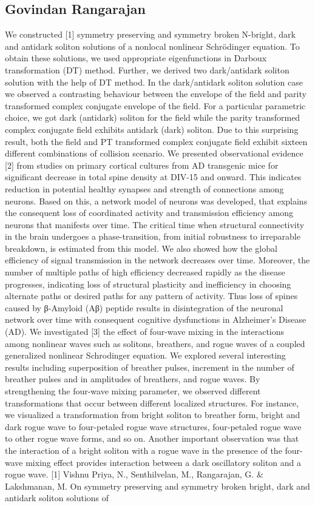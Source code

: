 \subsection{Govindan Rangarajan}

We constructed [1] symmetry preserving and symmetry broken N-bright, dark and antidark soliton solutions of a nonlocal nonlinear Schrödinger equation. To obtain these solutions, we used appropriate eigenfunctions in Darboux transformation (DT) method. Further, we derived two dark/antidark soliton solution with the help of DT method. In the dark/antidark soliton solution case we observed a contrasting behaviour between the envelope of the ﬁeld and parity transformed complex conjugate envelope of the ﬁeld. For a particular parametric choice, we got dark (antidark) soliton for the ﬁeld while the parity transformed complex conjugate ﬁeld exhibits antidark (dark) soliton. Due to this surprising result, both the ﬁeld and PT transformed complex conjugate ﬁeld exhibit sixteen different combinations of collision scenario.   We presented observational evidence [2] from studies on primary cortical cultures from AD transgenic mice for significant decrease in total spine density at DIV-15 and onward. This indicates reduction in potential healthy synapses and strength of connections among neurons. Based on this, a network model of neurons was developed, that explains the consequent loss of coordinated activity and transmission efficiency among neurons that manifests over time. The critical time when structural connectivity in the brain undergoes a phase-transition, from initial robustness to irreparable breakdown, is estimated from this model. We also showed how the global efficiency of signal transmission in the network decreases over time. Moreover, the number of multiple paths of high efficiency decreased rapidly as the disease progresses, indicating loss of structural plasticity and inefficiency in choosing alternate paths or desired paths for any pattern of activity. Thus loss of spines caused by β-Amyloid (Aβ) peptide results in disintegration of the neuronal network over time with consequent cognitive dysfunctions in Alzheimer’s Disease (AD).  We investigated [3] the effect of four-wave mixing in the interactions among nonlinear waves such as solitons, breathers, and rogue waves of a coupled generalized nonlinear Schrodinger equation. We explored several interesting results including superposition of breather pulses, increment in the number of breather pulses and in amplitudes of breathers, and rogue waves. By strengthening the four-wave mixing parameter, we observed different transformations that occur between different localized structures. For instance, we visualized a transformation from bright soliton to breather form, bright and dark rogue wave to four-petaled rogue wave structures, four-petaled rogue wave to other rogue wave forms, and so on. Another important observation was that the interaction of a bright soliton with a rogue wave in the presence of the four-wave mixing effect provides interaction between a dark oscillatory soliton and a rogue wave.  [1] Vishnu Priya, N., Senthilvelan, M.,  Rangarajan, G. & Lakshmanan, M. On symmetry preserving and symmetry broken bright, dark and antidark soliton solutions of 